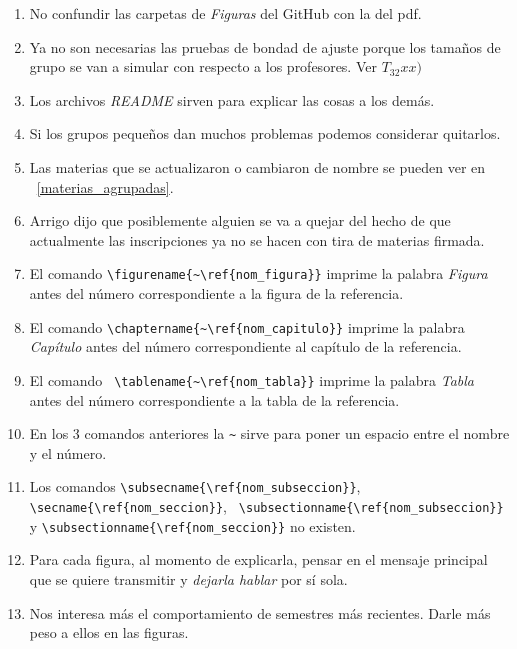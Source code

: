 \begin{appendices}
\begin{enumerate}
  \item No confundir las carpetas de \textit{Figuras} del GitHub con la del pdf.
  
  \item Ya no son necesarias las pruebas de bondad de ajuste porque los tamaños de grupo se van a simular con respecto a los profesores. Ver $T_{32} xx)$
  
  \item Los archivos \textit{README} sirven para explicar las cosas a los demás.
  
  \item Si los grupos pequeños dan muchos problemas podemos considerar quitarlos.
  
  \item Las materias que se actualizaron o cambiaron de nombre se pueden ver en \chaptername{~\ref{materias_agrupadas}}.
  
	\item Arrigo dijo que posiblemente alguien se va a quejar del hecho de que actualmente las inscripciones ya no se hacen con tira de materias firmada.
  
  \item El comando \verb+\figurename{~\ref{nom_figura}}+ imprime la palabra \textit{Figura} antes del número correspondiente a la figura de la referencia.
  
  \item El comando \verb+\chaptername{~\ref{nom_capitulo}}+ imprime la palabra \textit{Capítulo} antes del número correspondiente al capítulo de la referencia.

  \item El comando \verb+ \tablename{~\ref{nom_tabla}}+ imprime la palabra \textit{Tabla} antes del número correspondiente a la tabla de la referencia.

  \item En los 3 comandos anteriores la \verb+~+ sirve para poner un espacio entre el nombre y el número.
  
  \item Los comandos \verb+\subsecname{\ref{nom_subseccion}}+, \verb+ \secname{\ref{nom_seccion}}+, \verb+ \subsectionname{\ref{nom_subseccion}}+ y \verb+\subsectionname{\ref{nom_seccion}}+ no existen.
  
  \item Para cada figura, al momento de explicarla, pensar en el mensaje principal que se quiere transmitir y \textit{dejarla hablar} por sí sola.
  
  \item Nos interesa más el comportamiento de semestres más recientes. Darle más peso a ellos en las figuras.
  

\end{enumerate}
\end{appendices}
